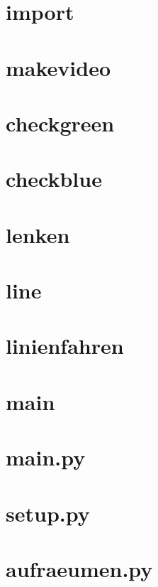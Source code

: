 \documentclass[a4paper,12pt]{article}
\begin{document}
\section{import}


\section{makevideo}


\section{checkgreen}


\section{checkblue}


\section{lenken}


\section{line}


\section{linienfahren}


\section{main}


\section{main.py}


\section{setup.py}


\section{aufraeumen.py}

\end{document}
